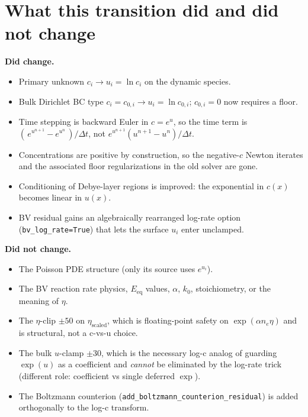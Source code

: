 \documentclass[11pt]{article}
\newcommand{\Eeq}{E_{\mathrm{eq}}}
\begin{document}
\section{What this transition did and did not change}

\textbf{Did change.}
\begin{itemize}
  \item Primary unknown $c_i \to u_i = \ln c_i$ on the dynamic species.
  \item Bulk Dirichlet BC type $c_i = c_{0,i} \to u_i = \ln c_{0,i}$;
        $c_{0,i}=0$ now requires a floor.
  \item Time stepping is backward Euler in $c = e^u$, so the time term is
        $(\,e^{u^{n+1}} - e^{u^n}\,)/\Delta t$, not $e^{u^{n+1}}(u^{n+1} - u^n)/\Delta t$.
  \item Concentrations are positive by construction, so the negative-$c$
        Newton iterates and the associated floor regularizations
        in the old solver are gone.
  \item Conditioning of Debye-layer regions is improved: the exponential
        in $c(x)$ becomes linear in $u(x)$.
  \item BV residual gains an algebraically rearranged log-rate option
        (\verb|bv_log_rate=True|) that lets the surface $u_i$ enter
        unclamped.
\end{itemize}

\textbf{Did not change.}
\begin{itemize}
  \item The Poisson PDE structure (only its source uses $e^{u_i}$).
  \item The BV reaction rate physics, $\Eeq$ values, $\alpha$, $k_0$,
        stoichiometry, or the meaning of $\eta$.
  \item The $\eta$-clip $\pm 50$ on $\eta_{\mathrm{scaled}}$, which is
        floating-point safety on $\exp(\alpha n_e \eta)$ and is structural,
        not a c-vs-u choice.
  \item The bulk $u$-clamp $\pm 30$, which is the necessary log-c analog
        of guarding $\exp(u)$ as a coefficient and \emph{cannot} be
        eliminated by the log-rate trick (different role: coefficient vs
        single deferred $\exp$).
  \item The Boltzmann counterion (\verb|add_boltzmann_counterion_residual|)
        is added orthogonally to the log-c transform.
\end{itemize}
\end{document}
